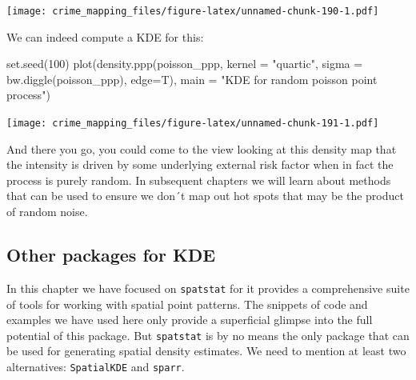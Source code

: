 \documentclass[
  krantz2]{krantz}
\makeatletter
\newenvironment{Shaded}{\begin{snugshade}}{\end{snugshade}}
\newcommand{\AttributeTok}[1]{\textcolor[rgb]{0.61,0.61,0.61}{#1}}
\newcommand{\DecValTok}[1]{\textcolor[rgb]{0.06,0.06,0.06}{#1}}
\newcommand{\FunctionTok}[1]{\textcolor[rgb]{0,0,0}{#1}}
\newcommand{\NormalTok}[1]{#1}
\newcommand{\OtherTok}[1]{\textcolor[rgb]{0.37,0.37,0.37}{#1}}
\newcommand{\SpecialCharTok}[1]{\textcolor[rgb]{0,0,0}{#1}}
\newcommand{\StringTok}[1]{\textcolor[rgb]{0.5,0.5,0.5}{#1}}
\newenvironment{kframe}{%
\medskip{}
\setlength{\fboxsep}{.8em}
 \def\at@end@of@kframe{}%
 \ifinner\ifhmode%
  \def\at@end@of@kframe{\end{minipage}}%
  \begin{minipage}{\columnwidth}%
 \fi\fi%
 \def\FrameCommand##1{\hskip\@totalleftmargin \hskip-\fboxsep
 \colorbox{shadecolor}{##1}\hskip-\fboxsep
     \hskip-\linewidth \hskip-\@totalleftmargin \hskip\columnwidth}%
 \MakeFramed {\advance\hsize-\width
   \@totalleftmargin\z@ \linewidth\hsize
   \@setminipage}}%
 {\par\unskip\endMakeFramed%
 \at@end@of@kframe}
\renewenvironment{Shaded}{\begin{kframe}}{\end{kframe}}
\makeatother
\begin{document}
\begin{Shaded}
\end{Shaded}

\texttt{[image: crime\_mapping\_files/figure-latex/unnamed-chunk-190-1.pdf]}

We can indeed compute a KDE for this:

\begin{Shaded}
\begin{Highlighting}[]
\FunctionTok{set.seed}\NormalTok{(}\DecValTok{100}\NormalTok{)}
\FunctionTok{plot}\NormalTok{(}\FunctionTok{density.ppp}\NormalTok{(poisson\_ppp, }\AttributeTok{kernel =} \StringTok{"quartic"}\NormalTok{,}
                 \AttributeTok{sigma =} \FunctionTok{bw.diggle}\NormalTok{(poisson\_ppp),}
                 \AttributeTok{edge=}\NormalTok{T), }
     \AttributeTok{main =} \StringTok{"KDE for random poisson point process"}\NormalTok{)}
\end{Highlighting}
\end{Shaded}

\texttt{[image: crime\_mapping\_files/figure-latex/unnamed-chunk-191-1.pdf]}

And there you go, you could come to the view looking at this density map that the intensity is driven by some underlying external risk factor when in fact the process is purely random. In subsequent chapters we will learn about methods that can be used to ensure we don´t map out hot spots that may be the product of random noise.

\hypertarget{other-packages-for-kde}{%
\subsection{Other packages for KDE}\label{other-packages-for-kde}}

In this chapter we have focused on \texttt{spatstat} for it provides a comprehensive suite of tools for working with spatial point patterns. The snippets of code and examples we have used here only provide a superficial glimpse into the full potential of this package. But \texttt{spatstat} is by no means the only package that can be used for generating spatial density estimates. We need to mention at least two alternatives: \texttt{SpatialKDE} and \texttt{sparr}.
\end{document}
